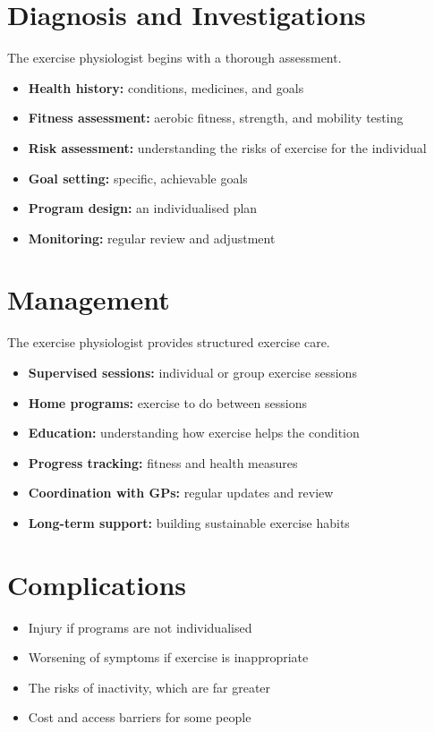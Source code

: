 \section*{Diagnosis and Investigations}
The exercise physiologist begins with a thorough assessment.
\begin{itemize}
    \item \textbf{Health history:} conditions, medicines, and goals
    \item \textbf{Fitness assessment:} aerobic fitness, strength, and mobility testing
    \item \textbf{Risk assessment:} understanding the risks of exercise for the individual
    \item \textbf{Goal setting:} specific, achievable goals
    \item \textbf{Program design:} an individualised plan
    \item \textbf{Monitoring:} regular review and adjustment
\end{itemize}

\section*{Management}
The exercise physiologist provides structured exercise care.
\begin{itemize}
    \item \textbf{Supervised sessions:} individual or group exercise sessions
    \item \textbf{Home programs:} exercise to do between sessions
    \item \textbf{Education:} understanding how exercise helps the condition
    \item \textbf{Progress tracking:} fitness and health measures
    \item \textbf{Coordination with GPs:} regular updates and review
    \item \textbf{Long-term support:} building sustainable exercise habits
\end{itemize}

\section*{Complications}
\begin{itemize}
    \item Injury if programs are not individualised
    \item Worsening of symptoms if exercise is inappropriate
    \item The risks of inactivity, which are far greater
    \item Cost and access barriers for some people
\end{itemize}

